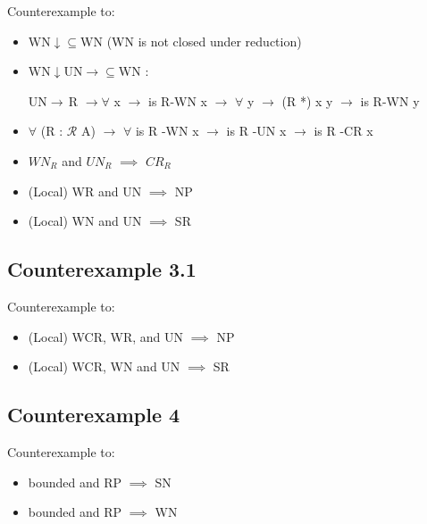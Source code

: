 \documentclass{scrartcl}
\begin{document}
Counterexample to:
\begin{itemize}
  \item WN$\downarrow\subseteq$WN (WN is not closed under reduction) 
  \item WN$\downarrow$UN$\rightarrow\subseteq$WN :

  UN$\rightarrow\,$R $\to \forall$ x $\to$ is R-WN x $\to$ $\forall$ y $\to$ (R *) x y $\to$ is R-WN y

  \item $\forall$ (R : $\mathscr{R}$ A) $\to$ $\forall$ is R -WN x $\to$ is R -UN x $\to$ is R -CR x
  \item $WN_R$ and $UN_R$ $\implies$ $CR_R$
  \item (Local) WR and UN $\implies$ NP 
  \item (Local) WN and UN $\implies$ SR

\end{itemize}

\subsection*{Counterexample 3.1}
\begin{center}
\end{center}

Counterexample to:
\begin{itemize}
  \item (Local) WCR, WR, and UN $\implies$ NP 
  \item (Local) WCR, WN and UN $\implies$ SR

\end{itemize}

\subsection*{Counterexample 4}

\begin{center}
\end{center}
Counterexample to:
\begin{itemize}
  \item bounded and RP $\implies$ SN
  \item bounded and RP $\implies$ WN
\end{itemize}
\end{document}
